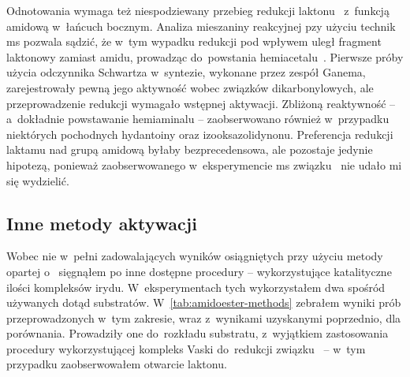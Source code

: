 Odnotowania wymaga też niespodziewany przebieg redukcji laktonu~
  z~funkcją amidową w~łańcuch bocznym.
Analiza mieszaniny reakcyjnej pzy użyciu technik \gls{ms} pozwala sądzić,
  że w~tym wypadku redukcji pod wpływem \schwartz{} uległ fragment laktonowy zamiast amidu,
  prowadząc do~powstania hemiacetalu~.
Pierwsze próby użycia odczynnika Schwartza w~syntezie, wykonane przez zespół Ganema,
  zarejestrowały pewną jego aktywność wobec związków dikarbonylowych, ale przeprowadzenie
  redukcji wymagało wstępnej aktywacji.
Zbliżoną reaktywność \--- a~dokładnie powstawanie hemiaminalu \--- zaobserwowano również
  w~przypadku niektórych pochodnych hydantoiny oraz izooksazolidynonu.
Preferencja redukcji laktamu nad grupą amidową byłaby bezprecedensowa,
  ale pozostaje jedynie hipotezą, ponieważ zaobserwowanego w~eksperymencie \gls{ms}
  związku~ nie udało mi się wydzielić.

\subsection{Inne metody aktywacji}
Wobec nie w~pełni zadowalających wyników osiągniętych przy użyciu metody opartej o~\schwartz{}
  sięgnąłem po inne dostępne procedury \--- wykorzystujące katalityczne ilości kompleksów irydu.
W~eksperymentach tych wykorzystałem dwa spośród używanych dotąd substratów.
W~\cref{tab:amidoester-methods} zebrałem wyniki prób przeprowadzonych w~tym zakresie,
  wraz z~wynikami uzyskanymi poprzednio, dla porównania.
Prowadziły one do~rozkładu substratu, z~wyjątkiem zastosowania procedury wykorzystującej
  kompleks Vaski do~redukcji związku~ \---
  w~tym przypadku zaobserwowałem otwarcie laktonu.

